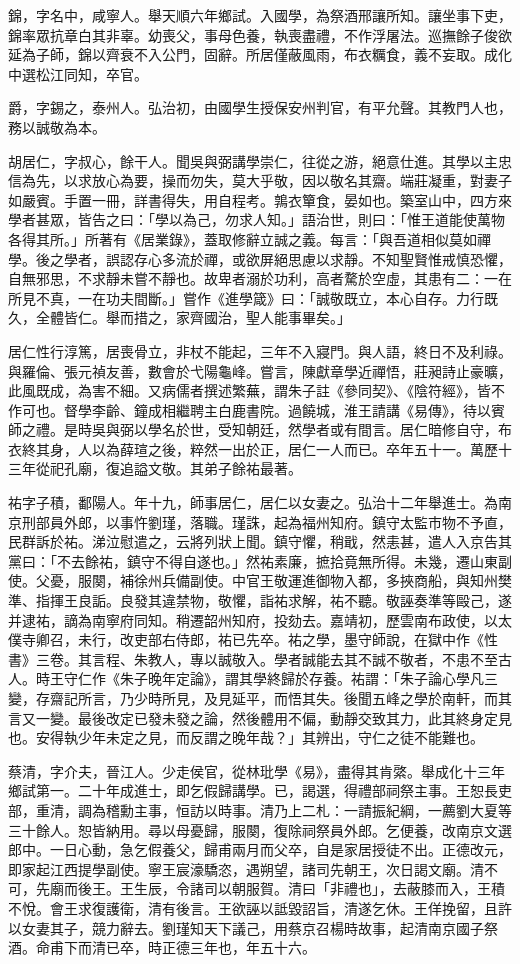 \begin{pinyinscope}
錦，字名中，咸寧人。舉天順六年鄉試。入國學，為祭酒邢讓所知。讓坐事下吏，錦率眾抗章白其非辜。幼喪父，事母色養，執喪盡禮，不作浮屠法。巡撫餘子俊欲延為子師，錦以齊衰不入公門，固辭。所居僅蔽風雨，布衣糲食，義不妄取。成化中選松江同知，卒官。

爵，字錫之，泰州人。弘治初，由國學生授保安州判官，有平允聲。其教門人也，務以誠敬為本。

胡居仁，字叔心，餘干人。聞吳與弼講學崇仁，往從之游，絕意仕進。其學以主忠信為先，以求放心為要，操而勿失，莫大乎敬，因以敬名其齋。端莊凝重，對妻子如嚴賓。手置一冊，詳書得失，用自程考。鶉衣簞食，晏如也。築室山中，四方來學者甚眾，皆告之曰：「學以為己，勿求人知。」語治世，則曰：「惟王道能使萬物各得其所。」所著有《居業錄》，蓋取修辭立誠之義。每言：「與吾道相似莫如禪學。後之學者，誤認存心多流於禪，或欲屏絕思慮以求靜。不知聖賢惟戒慎恐懼，自無邪思，不求靜未嘗不靜也。故卑者溺於功利，高者騖於空虛，其患有二：一在所見不真，一在功夫間斷。」嘗作《進學箴》曰：「誠敬既立，本心自存。力行既久，全體皆仁。舉而措之，家齊國治，聖人能事畢矣。」

居仁性行淳篤，居喪骨立，非杖不能起，三年不入寢門。與人語，終日不及利祿。與羅倫、張元禎友善，數會於弋陽龜峰。嘗言，陳獻章學近禪悟，莊昶詩止豪曠，此風既成，為害不細。又病儒者撰述繁蕪，謂朱子註《參同契》、《陰符經》，皆不作可也。督學李齡、鐘成相繼聘主白鹿書院。過饒城，淮王請講《易傳》，待以賓師之禮。是時吳與弼以學名於世，受知朝廷，然學者或有間言。居仁暗修自守，布衣終其身，人以為薛瑄之後，粹然一出於正，居仁一人而已。卒年五十一。萬歷十三年從祀孔廟，復追謚文敬。其弟子餘祐最著。

祐字子積，鄱陽人。年十九，師事居仁，居仁以女妻之。弘治十二年舉進士。為南京刑部員外郎，以事忤劉瑾，落職。瑾誅，起為福州知府。鎮守太監市物不予直，民群訴於祐。涕泣慰遣之，云將列狀上聞。鎮守懼，稍戢，然恚甚，遣人入京告其黨曰：「不去餘祐，鎮守不得自遂也。」然祐素廉，摭拾竟無所得。未幾，遷山東副使。父憂，服闋，補徐州兵備副使。中官王敬運進御物入都，多挾商船，與知州樊準、指揮王良詬。良發其違禁物，敬懼，詣祐求解，祐不聽。敬誣奏準等毆己，遂并逮祐，謫為南寧府同知。稍遷韶州知府，投劾去。嘉靖初，歷雲南布政使，以太僕寺卿召，未行，改吏部右侍郎，祐已先卒。祐之學，墨守師說，在獄中作《性書》三卷。其言程、朱教人，專以誠敬入。學者誠能去其不誠不敬者，不患不至古人。時王守仁作《朱子晚年定論》，謂其學終歸於存養。祐謂：「朱子論心學凡三變，存齋記所言，乃少時所見，及見延平，而悟其失。後聞五峰之學於南軒，而其言又一變。最後改定已發未發之論，然後體用不偏，動靜交致其力，此其終身定見也。安得執少年未定之見，而反謂之晚年哉？」其辨出，守仁之徒不能難也。

蔡清，字介夫，晉江人。少走侯官，從林玭學《易》，盡得其肯綮。舉成化十三年鄉試第一。二十年成進士，即乞假歸講學。已，謁選，得禮部祠祭主事。王恕長吏部，重清，調為稽勳主事，恒訪以時事。清乃上二札：一請振紀綱，一薦劉大夏等三十餘人。恕皆納用。尋以母憂歸，服闋，復除祠祭員外郎。乞便養，改南京文選郎中。一日心動，急乞假養父，歸甫兩月而父卒，自是家居授徒不出。正德改元，即家起江西提學副使。寧王宸濠驕恣，遇朔望，諸司先朝王，次日謁文廟。清不可，先廟而後王。王生辰，令諸司以朝服賀。清曰「非禮也」，去蔽膝而入，王積不悅。會王求復護衛，清有後言。王欲誣以詆毀詔旨，清遂乞休。王佯挽留，且許以女妻其子，競力辭去。劉瑾知天下議己，用蔡京召楊時故事，起清南京國子祭酒。命甫下而清已卒，時正德三年也，年五十六。


\end{pinyinscope}
